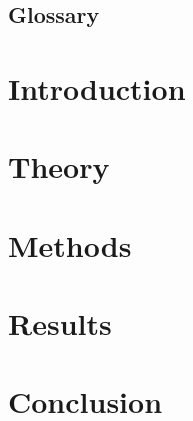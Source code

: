 \documentclass[12pt,a4paper,twoside,openright]{report}
\begin{document}



\newpage


\newpage


\newpage
\tableofcontents


\cleardoublepage
{} 
\listoffigures

\cleardoublepage
{}  
\listoftables

\newpage
\section*{Glossary}
    
\thispagestyle{plain}

\cleardoublepage
\setcounter{page}{1}
\setlength{\parskip}{0pt plus 1pt}

\chapter{Introduction}
    

\chapter{Theory}
    

\chapter{Methods}
    

\chapter{Results}
    

\chapter{Conclusion}
    
\end{document}
